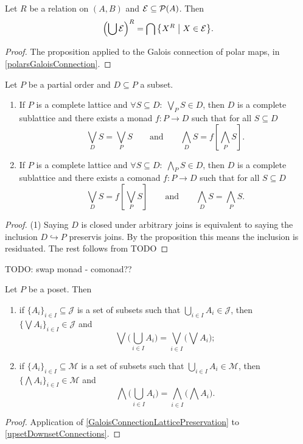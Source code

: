 \begin{corollary} \label{polarOfUnion}
Let $R$ be a relation on $(A,B)$ and $\mathcal{E}\subseteq \operatorname{\mathcal{P}}(A)$. Then
\[ \left(\bigcup\mathcal{E}\right)^R = \bigcap\setbuilder{{X^R}}{X\in \mathcal{E}}. \]
\end{corollary}
\begin{proof}
The proposition applied to the Galois connection of polar maps, in \ref{polarsGaloisConnection}.
\end{proof}

\begin{corollary} \label{completeSublattice}
Let $P$ be a partial order and $D\subseteq P$ a subset.
\begin{enumerate}
\item If $P$ is a complete lattice and $\forall S\subseteq D:\; \bigvee_P S \in D$, then $D$ is a complete sublattice and there exists a monad $f: P\to D$ such that for all $S\subseteq D$
\[ \bigvee_D S = \bigvee_P S \qquad\text{and}\qquad \bigwedge_D S = f\left[\bigwedge_P S\right]. \]
\item If $P$ is a complete lattice and $\forall S\subseteq D:\; \bigwedge_P S \in D$, then $D$ is a complete sublattice and there exists a comonad $f: P\to D$ such that for all $S\subseteq D$
\[ \bigvee_D S = f\left[\bigvee_P S\right] \qquad\text{and}\qquad \bigwedge_D S = \bigwedge_P S. \]
\end{enumerate}
\end{corollary}
\begin{proof}
(1) Saying $D$ is closed under arbitrary joins is equivalent to saying the inclusion $D\hookrightarrow P$ preservis joins. By the proposition this means the inclusion is residuated. The rest follows from TODO
\end{proof}
TODO: swap monad - comonad??

\begin{proposition} \label{joinMeetUnion}
Let $P$ be a poset. Then
\begin{enumerate}
\item if $\{A_i\}_{i\in I}\subseteq \mathcal{J}$ is a set of subsets such that $\bigcup_{i\in I}A_i \in \mathcal{J}$, then $\big\{\bigvee A_i\big\}_{i\in I} \in \mathcal{J}$ and
\[ \bigvee \Big(\bigcup_{i\in I}A_i\Big) = \bigvee_{i\in I}\Big(\bigvee A_i\Big); \]
\item if $\{A_i\}_{i\in I}\subseteq \mathcal{M}$ is a set of subsets such that $\bigcup_{i\in I}A_i \in \mathcal{M}$, then $\big\{\bigwedge A_i\big\}_{i\in I} \in \mathcal{M}$ and
\[ \bigwedge \Big(\bigcup_{i\in I}A_i\Big) = \bigwedge_{i\in I}\Big(\bigwedge A_i\Big). \]
\end{enumerate}
\end{proposition}
\begin{proof}
Application of \ref{GaloisConnectionLatticePreservation} to \ref{upsetDownsetConnections}.
\end{proof}

